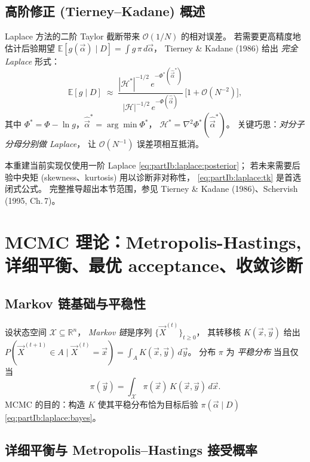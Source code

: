 \subsection{高阶修正 (Tierney--Kadane) 概述}
\label{sec:partIb:laplace:tk}

Laplace 方法的二阶 Taylor 截断带来 $\mathcal O(1/N)$ 的相对误差。
若需要更高精度地估计后验期望
$\mathbb E[g(\vec\alpha)\mid D]=\int g\,\pi\,d\vec\alpha$，
Tierney \& Kadane (1986) 给出 \emph{完全 Laplace} 形式：
\begin{equation}
  \mathbb E[g\mid D]
  \;\approx\;
  \frac{|\mathcal H^*|^{-1/2}\,e^{-\Phi^*(\hat{\vec\alpha}^*)}}
       {|\mathcal H |^{-1/2}\,e^{-\Phi(\hat{\vec\alpha})}}
  \,\bigl[1+\mathcal O(N^{-2})\bigr],
  \label{eq:partIb:laplace:tk}
\end{equation}
其中 $\Phi^*=\Phi-\ln g$，$\hat{\vec\alpha}^*=\arg\min\Phi^*$，
$\mathcal H^* = \nabla^2\Phi^*(\hat{\vec\alpha}^*)$。
关键巧思：\emph{对分子分母分别做 Laplace}，
让 $\mathcal O(N^{-1})$ 误差项相互抵消。

本重建当前实现仅使用一阶 Laplace
\eqref{eq:partIb:laplace:posterior}；
若未来需要后验中央矩 (skewness、kurtosis) 用以诊断非对称性，
\eqref{eq:partIb:laplace:tk} 是首选闭式公式。
完整推导超出本节范围，参见 Tierney \& Kadane (1986)、Schervish (1995, Ch.\,7)。

\section{MCMC 理论：Metropolis-Hastings, 详细平衡、最优 acceptance、收敛诊断}
\label{sec:partIb:mcmc}

\subsection{Markov 链基础与平稳性}
\label{sec:partIb:mcmc:basics}

设状态空间 $\mathcal X\subseteq\mathbb R^n$，
\emph{Markov 链}是序列 $\{\vec X^{(t)}\}_{t\geq 0}$，
其转移核 $K(\vec x,\vec y)$ 给出
$P(\vec X^{(t+1)}\in A\mid\vec X^{(t)}=\vec x)=\int_A K(\vec x,\vec y)\,d\vec y$。
分布 $\pi$ 为 \emph{平稳分布} 当且仅当
\begin{equation}
  \pi(\vec y)=\int_{\mathcal X}\pi(\vec x)\,K(\vec x,\vec y)\,d\vec x.
  \label{eq:partIb:mcmc:stationary}
\end{equation}
MCMC 的目的：构造 $K$ 使其平稳分布恰为目标后验
$\pi(\vec\alpha\mid D)$ \eqref{eq:partIb:laplace:bayes}。

\subsection{详细平衡与 Metropolis--Hastings 接受概率}
\label{sec:partIb:mcmc:db}

